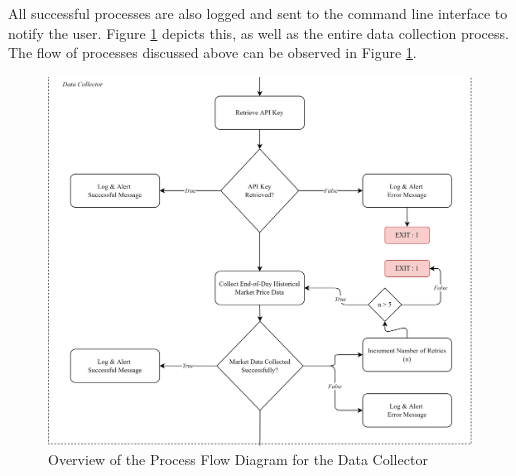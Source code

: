 All successful processes are also logged and sent to the command line interface to notify the user. 
Figure \ref{fig:process_flowchart_data_collector} depicts this, as well as the entire data collection process.
The flow of processes discussed above can be observed in Figure \ref{fig:process_flowchart_data_collector}.
\begin{figure}[ht]
    \centering
    \includegraphics[width=1\textwidth]{./assets/Chapter_3/PFC/ProcessFlowchart_DataCollector.png}
    \caption{Overview of the Process Flow Diagram for the Data Collector}
    \label{fig:process_flowchart_data_collector}
\end{figure}
\FloatBarrier

